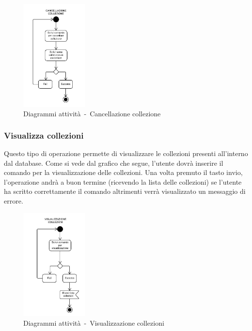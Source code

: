 \documentclass{scalatekids-article}
\begin{document}
\begin{figure}[H]
  \begin{center}
    \includegraphics[width=0.3\textwidth, keepaspectratio]{img/diagrammiAttivita/cancCollezione.jpeg}
    \caption{Diagrammi attività\ -\ Cancellazione collezione}
  \end{center}
\end{figure}

\subsubsection{Visualizza collezioni}

Questo tipo di operazione permette di visualizzare le collezioni presenti
all'interno dal database. Come si vede dal grafico che segue, l'utente dovrà
inserire il comando per la visualizzazione delle collezioni. Una volta premuto
il tasto invio, l'operazione andrà a buon termine (ricevendo la lista delle
collezioni) se l'utente ha scritto correttamente il comando altrimenti verrà
visualizzato un messaggio di errore.

\begin{figure}[H]
  \begin{center}
    \includegraphics[width=0.3\textwidth, keepaspectratio]{img/diagrammiAttivita/visCollezione.jpeg}
    \caption{Diagrammi attività\ -\ Visualizzazione collezioni}
  \end{center}
\end{figure}
\end{document}
